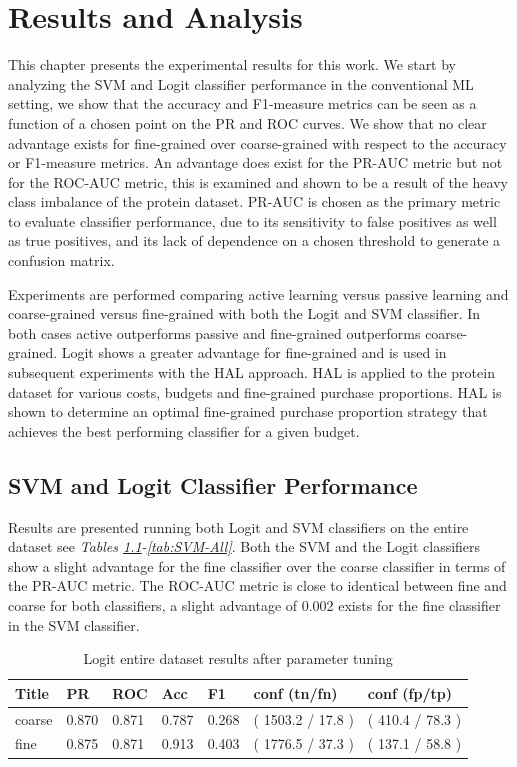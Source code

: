 \documentclass[ms]{nuthesis}
\begin{document}
\chapter{Results and Analysis}
\par This chapter presents the experimental results for this work. We start by analyzing
 the SVM and Logit classifier performance in the conventional ML setting, we show that the
 accuracy and F1-measure metrics can be seen as a function of a chosen point on the PR and ROC curves.
 We show that no clear advantage exists for fine-grained over coarse-grained with respect to the accuracy
    or F1-measure metrics. An advantage does exist for the PR-AUC metric but not for the ROC-AUC metric, this
    is examined and shown to be a result of the heavy class imbalance of the protein dataset. PR-AUC is
    chosen as the primary metric to evaluate classifier performance, due to its sensitivity to false positives as
    well as true positives, and its lack of dependence on a chosen threshold to generate a confusion matrix.
    \par Experiments are performed comparing active learning versus passive learning and coarse-grained versus
    fine-grained with both the Logit and SVM classifier. In both cases active outperforms passive and fine-grained
    outperforms coarse-grained. Logit shows a greater advantage for fine-grained and is used in subsequent experiments
    with the HAL approach. HAL is applied to the protein dataset for various costs, budgets and
    fine-grained purchase proportions. HAL is shown to determine an optimal fine-grained purchase proportion
    strategy that achieves the best performing classifier for a given budget.

\section{SVM and Logit Classifier Performance}
\par Results are presented running both Logit and SVM classifiers on the entire dataset
see \textit{Tables \ref{tab:LogRegAll-Wt23}-\ref{tab:SVM-All}}.
Both the SVM and the Logit classifiers show a slight advantage for the fine
classifier over the coarse classifier in terms of the PR-AUC metric. The ROC-AUC
metric is close to identical between fine and coarse for both classifiers, a slight
advantage of 0.002 exists for the fine classifier in the SVM classifier.


\FloatBarrier
\begin{table}[H]
\centering
\caption{Logit entire dataset results after parameter tuning}
\label{tab:LogRegAll-Wt23}
\begin{tabular}{|l||l||l||l||l||l||l|}\toprule
Title & PR & ROC & Acc & F1 & conf (tn/fn) & conf (fp/tp) \\ \midrule
coarse & 0.870 & 0.871 & 0.787 & 0.268 & ( 1503.2 / 17.8 ) & ( 410.4 / 78.3 ) \\
fine & 0.875 & 0.871 & 0.913 & 0.403 & ( 1776.5 / 37.3 ) & ( 137.1 / 58.8 ) \\ \bottomrule
\end{tabular}
\end{table}
\FloatBarrier
\end{document}
